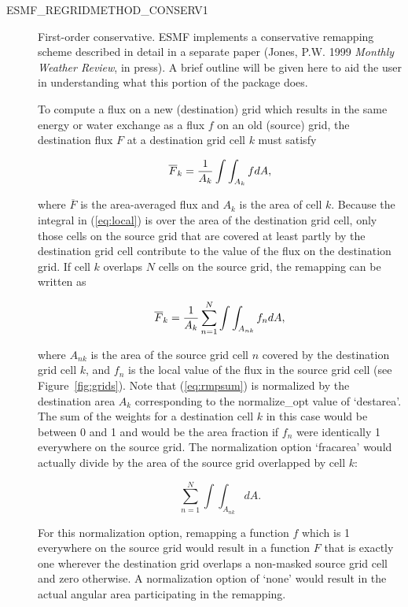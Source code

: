 \begin{description}
\item[ESMF\_REGRIDMETHOD\_CONSERV1]
     First-order conservative.  ESMF implements a conservative remapping
     scheme described in detail in a separate paper (Jones, P.W. 1999
     {\em Monthly Weather Review}, in press).  A brief outline will be given
     here to aid the user in understanding what this portion of the package does.

     To compute a flux on a new (destination) grid which results in the same
     energy or water exchange as a flux $f$ on an old (source) grid, the
     destination flux $F$ at a destination grid cell $k$ must satisfy

\begin{equation}\label{eq:local}
\overline{F}_k = {1\over{A_k}}\int\int_{A_k} fdA,
\end{equation}

     where $\overline{F}$ is the area-averaged flux and $A_k$ is the area of
     cell $k$. Because the integral in (\ref{eq:local}) is over the area of 
     the destination grid cell, only those cells on the source grid that are
     covered at least partly by the destination grid cell contribute to the
     value of the flux on the destination grid.  If cell $k$ overlaps $N$ cells
     on the source grid, the remapping can be written as 

\begin{equation}\label{eq:rmpsum}
\overline{F}_k = 
{1\over{A_k}} \sum_{n=1}^N \int\int_{A_{nk}} f_ndA,
\end{equation}

     where $A_{nk}$ is the area of the source grid cell $n$ covered by the
     destination grid cell $k$, and $f_n$ is the local value of the flux in the
     source grid cell (see Figure~\ref{fig:grids}).  Note that (\ref{eq:rmpsum})
     is normalized by the destination area $A_k$ corresponding to the
     normalize\_opt value of `destarea'.  The sum of the weights for a
     destination cell $k$ in this case would be between 0 and 1 and would be the
     area fraction if $f_n$ were identically 1 everywhere on the source grid.
     The normalization option `fracarea' would actually divide by the area of
     the source grid overlapped by cell $k$: 

\begin{equation}
\sum_{n=1}^N \int\int_{A_{nk}}dA.
\end{equation}

     For this normalization option, remapping a function $f$ which is 1
     everywhere on the source grid would result in a function $F$ that is
     exactly one wherever the destination grid overlaps a non-masked source
     grid cell and zero otherwise.  A normalization option of `none' would
     result in the actual angular area participating in the remapping.


\end{description}
